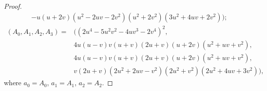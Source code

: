 \documentclass[10pt,a4paper]{amsart}
\begin{document}
\begin{proof}
\begin{align*}
	& -u(u + 2v)(u^2 - 2uv - 2v^2)(u^2 + 2v^2)(3u^2 + 4uv + 2v^2) );
\end{align*}
\begin{align*}
	(A_0,A_1,A_2,A_3) = & ((2u^4 - 5u^2v^2 - 4uv^3 - 2v^4)^2, \\
	& 4u(u - v)v(u + v)(2u + v)(u + 2v)(u^2 + uv + v^2), \\
	& 4u(u - v)v(u + v)(2u + v)(u + 2v)(u^2 + uv + v^2), \\
	& v(2u + v)(2u^2 + 2uv - v^2)(2u^2 + v^2)(2u^2 + 4uv + 3v^2)),
\end{align*}
where $a_0=A_0$, $a_1=A_1$, $a_2=A_2$.
\end{proof}
\end{document}
